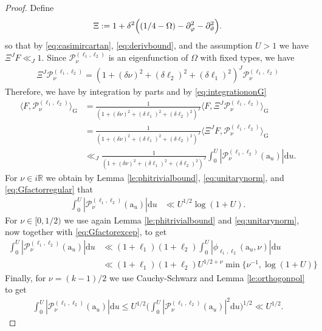 \documentclass[12pt]{amsart}
\theoremstyle{definition}
\theoremstyle{remark}
\numberwithin{equation}{section}
\newcommand{\G}{\mathrm{G}}
\newcommand{\R}{{\mathbb R}}
\newcommand{\1}{{\mathbf 1}}
\renewcommand{\a}{\mathrm{a}}
\renewcommand{\d}{\mathrm d}
\begin{document}
\begin{proof}
  Define
   \begin{align*}
       \Xi := 1+ \delta^2 \Bigl((1/4-\Omega) -\partial_{\varphi}^2 - \partial_\vartheta^2\Bigr).
   \end{align*}
    so that by \eqref{eq:casimircartan}, \eqref{eq:derivbound}, and the assumption $U> 1$ we have  $  \Xi^{J} F   \ll_J 1.$ Since $\mathcal{P}^{(\ell_1,\ell_2)}_{\nu}$ is an eigenfunction of $\Omega$ with fixed types, we have
    \begin{align*}
        \Xi^{J} \mathcal{P}^{(\ell_1,\ell_2)}_{\nu} =(1+(\delta \nu)^2+(\delta\ell_2)^2+(\delta \ell_1)^2)^J \mathcal{P}^{(\ell_1,\ell_2)}_{\nu}
    \end{align*}
    Therefore, we have by integration by parts and by \eqref{eq:integrationonG}
     \begin{align*}
        \langle F, \mathcal{P}^{(\ell_1,\ell_2)}_{\nu}\rangle_{\G}&=  \frac{1}{(1+(\delta\nu)^2+(\delta \ell_1)^2+(\delta \ell_2)^2)^J}  \langle F, \Xi^J\mathcal{P}^{(\ell_1,\ell_2)}_{\nu}\rangle_{\G}\\
    &  =  \frac{1}{(1+(\delta \nu)^2+(\delta \ell_1)^2+(\delta \ell_2)^2)^J }\langle \Xi^J F, \mathcal{P}^{(\ell_1,\ell_2)}_{\nu}\rangle_{\G}  \\
 & \ll_J\frac{1}{(1+(\delta \nu)^2+(\delta \ell_1)^2+(\delta \ell_2)^2)^J} \int_{0}^{ U} |\mathcal{P}^{(\ell_1,\ell_2)}_{\nu}(\a_u)|\d u.
   \end{align*}
For $\nu \in i \R$ we obtain by Lemma \ref{le:phitrivialbound}, \eqref{eq:unitarynorm}, and \eqref{eq:Gfactorregular} that
\begin{align*}
\int_{0}^{U} |\mathcal{P}^{(\ell_1,\ell_2)}_{\nu}(\a_u)|\d u  & \ll U^{1/2}\log(1+U).
\end{align*}
For $\nu \in [0,1/2)$  we use again Lemma  \ref{le:phitrivialbound} and \eqref{eq:unitarynorm}, now together with \eqref{eq:Gfactorexcep}, to get
\begin{align*}
    \int_{0}^{U} |\mathcal{P}^{(\ell_1,\ell_2)}_{\nu}(\a_u)|\d u & \ll  (1+\ell_1)(1+\ell_2)  \int_{0}^{U} |\phi_{\ell_1,\ell_2}(\a_u,\nu)|\d u \\
& \ll (1+\ell_1)(1+\ell_2) U^{1/2+\nu}\min\{\nu^{-1}, \log(1+U)\}
\end{align*}
Finally, for $\nu=(k-1)/2$ we use Cauchy-Schwarz and Lemma \ref{le:orthogonpol} to get 
\begin{align*}
    \int_{0}^{U} |\mathcal{P}^{(\ell_1,\ell_2)}_{\nu}(\a_u)|\d u  \leq  U^{1/2} \bigg(\int_{0}^{U} |\mathcal{P}^{(\ell_1,\ell_2)}_{\nu}(\a_u)|^2\d u \bigg)^{1/2}  \ll U^{1/2}.
\end{align*}
\end{proof}
\end{document}
